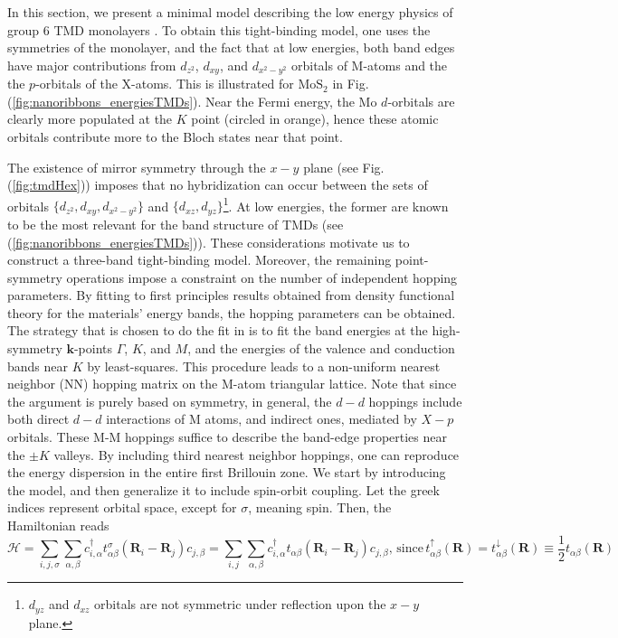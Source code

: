 In this section, we present a minimal model describing the low energy physics of group 6 \acs{TMD} monolayers \cite{liu_three-band_2013}.
To obtain this tight-binding model, one uses the symmetries of the monolayer, and the fact that at low energies, both band edges have major contributions from $d_{z^2}$, $d_{xy}$, and $d_{x^2 - y^2}$ orbitals of M-atoms and the the $p$-orbitals of the X-atoms.
This is illustrated for $\text{Mo}\text{S}_2$ in Fig.(\ref{fig:nanoribbons_energiesTMDs}).
Near the Fermi energy, the $\text{Mo}$ $d$-orbitals are clearly more populated at the $K$ point (circled in orange), hence these atomic orbitals contribute more to the Bloch states near that point.

The existence of mirror symmetry through the $x-y$ plane (see Fig.(\ref{fig:tmdHex})) imposes that no hybridization can occur between the sets of orbitals $\{d_{z^2}, d_{xy}, d_{x^2 - y^2} \}$ and $\{d_{xz}, d_{yz} \}$\footnote{$d_{yz}$ and $d_{xz}$ orbitals are not symmetric under reflection upon the $x-y$ plane.}.
At low energies, the former are known to be the most relevant for the band structure of \ac{TMD}s (see  (\ref{fig:nanoribbons_energiesTMDs})).
These considerations motivate us to construct a three-band tight-binding model.
Moreover, the remaining point-symmetry operations impose a constraint on the number of independent hopping parameters.
By fitting to first principles results obtained from density functional theory %
for the materials' energy bands, the hopping parameters can be obtained.
The strategy that is chosen to do the fit in \cite{liu_three-band_2013} is to fit the band energies at the high-symmetry $\bm k$-points $\Gamma$, $K$, and $M$, and the energies of the valence and conduction bands near $K$ by least-squares.
This procedure leads to a non-uniform nearest neighbor (NN) hopping matrix on the M-atom triangular lattice.
Note that since the argument is purely based on symmetry, in general, the $d-d$ hoppings include both direct $d-d$ interactions of M atoms, and indirect ones, mediated by $X-p$ orbitals.
These M-M hoppings suffice to describe the band-edge properties near the $\pm K$ valleys.
By including third nearest neighbor hoppings, one can reproduce the energy dispersion in  the entire first Brillouin zone.
We start by introducing the  model, and then generalize it to include spin-orbit coupling.
Let the greek indices represent orbital space, except for $\sigma$, meaning spin.
Then, the Hamiltonian reads
\begin{equation}
\mathcal{H} = \sum_{i, j, \sigma} \sum_{\alpha, \beta} c_{i,\alpha}^\dagger t_{\alpha \beta}^\sigma ( \bm R_i - \bm R_j ) c_{j, \beta} = \sum_{i, j} \sum_{\alpha, \beta} c_{i,\alpha}^\dagger t_{\alpha \beta} ( \bm R_i - \bm R_j ) c_{j, \beta} , \, \text{since} \,  t_{\alpha \beta}^\uparrow ( \bm R )  = t_{\alpha \beta}^\downarrow ( \bm R ) \equiv \frac{1}{2} t_{\alpha \beta} ( \bm R )
\end{equation}
